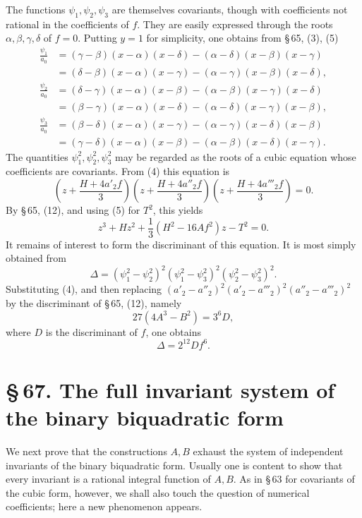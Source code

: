 \documentclass[11pt]{article}
\providecommand{\sect}[2]{\section*{\S\,#1. #2}}
\begin{document}
The functions $\psi_1,\psi_2,\psi_3$ are themselves covariants, though with coefficients not rational in the coefficients of $f$. They are easily expressed through the roots $\alpha,\beta,\gamma,\delta$ of $f=0$. Putting $y=1$ for simplicity, one obtains from \S\,65, (3), (5)
\[
\begin{aligned}
\frac{\psi_1}{a_0}&=(\gamma-\beta)(x-\alpha)(x-\delta)-(\alpha-\delta)(x-\beta)(x-\gamma)\\
&=(\delta-\beta)(x-\alpha)(x-\gamma)-(\alpha-\gamma)(x-\beta)(x-\delta),\\[0.3em]
\frac{\psi_2}{a_0}&=(\delta-\gamma)(x-\alpha)(x-\beta)-(\alpha-\beta)(x-\gamma)(x-\delta)\\
&=(\beta-\gamma)(x-\alpha)(x-\delta)-(\alpha-\delta)(x-\gamma)(x-\beta),\\[0.3em]
\frac{\psi_3}{a_0}&=(\beta-\delta)(x-\alpha)(x-\gamma)-(\alpha-\gamma)(x-\delta)(x-\beta)\\
&=(\gamma-\delta)(x-\alpha)(x-\beta)-(\alpha-\beta)(x-\delta)(x-\gamma).
\end{aligned}
\tag{6}
\]
The quantities $\psi_1^2,\psi_2^2,\psi_3^2$ may be regarded as the roots of a cubic equation whose coefficients are covariants. From (4) this equation is
\[
 \left(z+\frac{H+4a'_2f}{3}\right)
 \left(z+\frac{H+4a''_2f}{3}\right)
 \left(z+\frac{H+4a'''_2f}{3}\right)=0.
\]
By \S\,65, (12), and using (5) for $T^2$, this yields
\begin{equation}
 z^3+Hz^2+\frac13(H^2-16Af^2)z-T^2=0.
\tag{7}
\end{equation}
It remains of interest to form the discriminant of this equation. It is most simply obtained from
\[
 \Delta=(\psi_1^2-\psi_2^2)^2(\psi_1^2-\psi_3^2)^2(\psi_2^2-\psi_3^2)^2.
\]
Substituting (4), and then replacing $(a'_2-a''_2)^2(a'_2-a'''_2)^2(a''_2-a'''_2)^2$ by the discriminant of \S\,65, (12), namely
\[
 27(4A^3-B^2)=3^6D,
\]
where $D$ is the discriminant of $f$, one obtains
\begin{equation}
 \Delta=2^{12}Df^6.
\tag{8}
\end{equation}

\sect{67}{The full invariant system of the binary biquadratic form}

We next prove that the constructions $A,B$ exhaust the system of independent invariants of the binary biquadratic form. Usually one is content to show that every invariant is a rational integral function of $A,B$. As in \S\,63 for covariants of the cubic form, however, we shall also touch the question of numerical coefficients; here a new phenomenon appears.
\end{document}
